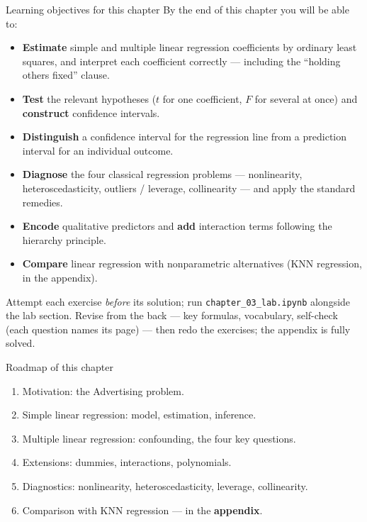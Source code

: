 \documentclass[aspectratio=169,11pt]{beamer}
\begin{document}
\begin{frame}{Learning objectives for this chapter}
  \footnotesize
  By the end of this chapter you will be able to:
  \begin{itemize}
    \item \textbf{Estimate} simple and multiple linear regression
          coefficients by ordinary least squares, and interpret each
          coefficient correctly --- including the ``holding others
          fixed'' clause.
    \item \textbf{Test} the relevant hypotheses ($t$ for one
          coefficient, $F$ for several at once) and \textbf{construct}
          confidence intervals.
    \item \textbf{Distinguish} a confidence interval for the regression
          line from a prediction interval for an individual outcome.
    \item \textbf{Diagnose} the four classical regression problems ---
          nonlinearity, heteroscedasticity, outliers / leverage,
          collinearity --- and apply the standard remedies.
    \item \textbf{Encode} qualitative predictors and \textbf{add}
          interaction terms following the hierarchy principle.
    \item \textbf{Compare} linear regression with nonparametric
          alternatives (KNN regression, in the appendix).
  \end{itemize}
  \begin{readme}
    \footnotesize Attempt each exercise \emph{before} its solution; run
    \texttt{chapter\_03\_lab.ipynb} alongside the lab section. Revise from the
    back --- key formulas, vocabulary, self-check (each question names its
    page) --- then redo the exercises; the appendix is fully solved.
  \end{readme}
\end{frame}


\begin{frame}{Roadmap of this chapter}
  \begin{takeaway}
    \begin{enumerate}
      \item Motivation: the Advertising problem.
      \item Simple linear regression: model, estimation, inference.
      \item Multiple linear regression: confounding, the four key questions.
      \item Extensions: dummies, interactions, polynomials.
      \item Diagnostics: nonlinearity, heteroscedasticity, leverage,
            collinearity.
      \item Comparison with KNN regression --- in the \textbf{appendix}.
    \end{enumerate}
  \end{takeaway}
\end{frame}
\end{document}
